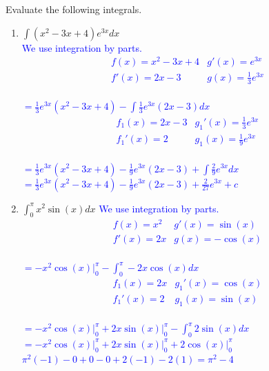 \documentclass{ximera}
\begin{document}
\begin{exercise}
    Evaluate the following integrals.
    \begin{enumerate}
        \item $\displaystyle \int (x^2-3x+4)e^{3x}dx$\\
        \textcolor{blue}{We use integration by parts.
        \[\begin{array}{c|c}
           f(x)=x^2-3x+4  & g'(x)=e^{3x} \\ \hline
           f'(x)=2x-3  &  g(x)=\frac13e^{3x}
        \end{array}\]\\
        $=\frac13e^{3x}(x^2-3x+4)-\displaystyle\int\frac13e^{3x}(2x-3)dx$\\
         \[\begin{array}{c|c}
           f_1(x)=2x-3  & g_1'(x)=\frac13e^{3x}  \\\hline
           f_1'(x)=2  &  g_1(x)=\frac19e^{3x}
        \end{array}\]\\
        $=\frac13e^{3x}(x^2-3x+4)-\frac19e^{3x}(2x-3)+\displaystyle\int\frac29e^{3x}dx$\\
        $=\frac13e^{3x}(x^2-3x+4)-\frac19e^{3x}(2x-3)+\frac2{27}e^{3x}+c$\\}
        
        \item $\displaystyle \int_0^\pi x^2\sin(x)dx$
        \textcolor{blue}{We use integration by parts.
        \[\begin{array}{c|c}
            f(x)=x^2 & g'(x)=\sin(x) \\ \hline
            f'(x)=2x & g(x)=-\cos(x)
        \end{array}\]\\
        $=-x^2\cos(x)\bigg|_0^{\pi}-\displaystyle\int_0^{\pi} -2x\cos(x)dx$\\
        \[\begin{array}{c|c}
            f_1(x)=2x & g_1'(x)=\cos(x) \\ \hline
            f_1'(x)=2 & g_1(x)=\sin(x)
        \end{array}\]\\
         $=-x^2\cos(x)\bigg|_0^{\pi}+2x\sin(x)\bigg|_0^{\pi}-\displaystyle\int_0^{\pi} 2\sin(x)dx$\\
         $=-x^2\cos(x)\bigg|_0^{\pi}+2x\sin(x)\bigg|_0^{\pi}+2\cos(x)\bigg|_0^{\pi}$\\
         $\pi^2(-1)-0+0-0+2(-1)-2(1)=\pi^2-4$}
        

\end{enumerate}
\end{exercise}
\end{document}

